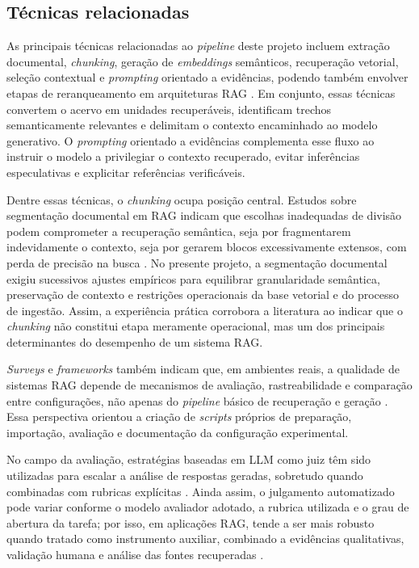 \subsection{Técnicas relacionadas}

As principais técnicas relacionadas ao \textit{pipeline} deste projeto incluem extração documental, \textit{chunking}, geração de \textit{embeddings} semânticos, recuperação vetorial, seleção contextual e \textit{prompting} orientado a evidências, podendo também envolver etapas de reranqueamento em arquiteturas RAG \parencite{gao2023ragSurvey,maharjan2026chunkingReranking,wangEtAl2025segmentation}. Em conjunto, essas técnicas convertem o acervo em unidades recuperáveis, identificam trechos semanticamente relevantes e delimitam o contexto encaminhado ao modelo generativo. O \textit{prompting} orientado a evidências complementa esse fluxo ao instruir o modelo a privilegiar o contexto recuperado, evitar inferências especulativas e explicitar referências verificáveis.

Dentre essas técnicas, o \textit{chunking} ocupa posição central. Estudos sobre segmentação documental em RAG indicam que escolhas inadequadas de divisão podem comprometer a recuperação semântica, seja por fragmentarem indevidamente o contexto, seja por gerarem blocos excessivamente extensos, com perda de precisão na busca \parencite{wangEtAl2025segmentation,bhatEtAl2025chunkSize}. No presente projeto, a segmentação documental exigiu sucessivos ajustes empíricos para equilibrar granularidade semântica, preservação de contexto e restrições operacionais da base vetorial e do processo de ingestão. Assim, a experiência prática corrobora a literatura ao indicar que o \textit{chunking} não constitui etapa meramente operacional, mas um dos principais determinantes do desempenho de um sistema RAG.

\textit{Surveys} e \textit{frameworks} também indicam que, em ambientes reais, a qualidade de sistemas RAG depende de mecanismos de avaliação, rastreabilidade e comparação entre configurações, não apenas do \textit{pipeline} básico de recuperação e geração \parencite{gao2023ragSurvey,saadFalconEtAl2024ares,esEtAl2023ragas}. Essa perspectiva orientou a criação de \textit{scripts} próprios de preparação, importação, avaliação e documentação da configuração experimental.

No campo da avaliação, estratégias baseadas em LLM como juiz têm sido utilizadas para escalar a análise de respostas geradas, sobretudo quando combinadas com rubricas explícitas \parencite{liuEtAl2023geval,liuEtAl2025judgeRag}. Ainda assim, o julgamento automatizado pode variar conforme o modelo avaliador adotado, a rubrica utilizada e o grau de abertura da tarefa; por isso, em aplicações RAG, tende a ser mais robusto quando tratado como instrumento auxiliar, combinado a evidências qualitativas, validação humana e análise das fontes recuperadas \parencite{liuEtAl2025judgeRag,liuEtAl2023geval,saadFalconEtAl2024ares,esEtAl2023ragas}.

